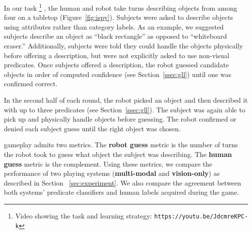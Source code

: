 In our \ispy task
\footnote{Video showing the \ispy task and learning strategy: \texttt{https://youtu.be/JdcmreKPC-k}}
, the human and robot take turns describing objects from among four on a tabletop (Figure~\ref{fig:ispy}).
Subjects were asked to describe objects using attributes rather than category labels.
As an example, we suggested subjects describe an object as ``black rectangle'' as opposed to ``whiteboard eraser.''
Additionally, subjects were told they could handle the objects physically before offering a description, but were not explicitly asked to use non-visual predicates.
Once subjects offered a description, the robot guessed candidate objects in order of computed confidence (see Section~\ref{ssec:gll}) until one was confirmed correct.

In the second half of each round, the robot picked an object and then described it with up to three predicates (see Section~\ref{ssec:gll}).
The subject was again able to pick up and physically handle objects before guessing.
The robot confirmed or denied each subject guess until the right object was chosen.

\ispy gameplay admits two metrics.
The \textbf{robot guess} metric is the number of turns the robot took to guess what object the subject was describing.
The \textbf{human guess} metric is the complement.
Using these metrics, we compare the performance of two \ispy playing systems (\textbf{multi-modal} and \textbf{vision-only}) as described in Section ~\ref{sec:experiment}.
We also compare the agreement between both systems' predicate classifiers and human labels acquired during the game.